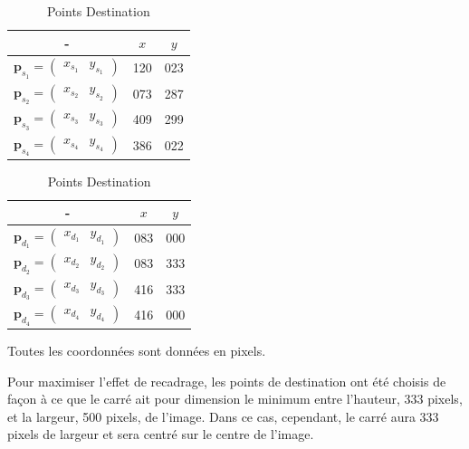 \documentclass[../5RO17_TP1.tex]{subfiles}
\begin{document}
\begin{table}[H]
    \centering
    \caption{Points Homographie}
    \label{tab_homography_points}
    \begin{subtable}[t]{0.475\textwidth}
        \centering
        \begin{tabular}{ccc}
            - & $x$ & $y$\\
            \hline
            $\mathbf{p}_{s_{1}} = \begin{pmatrix} x_{s_{1}} & y_{s_{1}} \end{pmatrix}$ & 120 & 023\\
            $\mathbf{p}_{s_{2}} = \begin{pmatrix} x_{s_{2}} & y_{s_{2}} \end{pmatrix}$ & 073 & 287\\
            $\mathbf{p}_{s_{3}} = \begin{pmatrix} x_{s_{3}} & y_{s_{3}} \end{pmatrix}$ & 409 & 299\\
            $\mathbf{p}_{s_{4}} = \begin{pmatrix} x_{s_{4}} & y_{s_{4}} \end{pmatrix}$ & 386 & 022\\
            \hline
        \end{tabular}
        \caption{Points Source}
    \end{subtable}
    \hfill
    \begin{subtable}[t]{0.475\textwidth}
        \centering
        \begin{tabular}{ccc}
            - & $x$ & $y$\\
            \hline
            $\mathbf{p}_{d_{1}} = \begin{pmatrix} x_{d_{1}} & y_{d_{1}} \end{pmatrix}$ & 083 & 000\\
            $\mathbf{p}_{d_{2}} = \begin{pmatrix} x_{d_{2}} & y_{d_{2}} \end{pmatrix}$ & 083 & 333\\
            $\mathbf{p}_{d_{3}} = \begin{pmatrix} x_{d_{3}} & y_{d_{3}} \end{pmatrix}$ & 416 & 333\\
            $\mathbf{p}_{d_{4}} = \begin{pmatrix} x_{d_{4}} & y_{d_{4}} \end{pmatrix}$ & 416 & 000\\
            \hline
        \end{tabular}
        \caption{Points Destination}
    \end{subtable}
\end{table}
\begin{remark}
    Toutes les coordonnées sont données en pixels.
\end{remark}
\noindent Pour maximiser l'effet de recadrage, les points de destination ont été choisis de façon à ce que le carré ait pour dimension le minimum entre l'hauteur, 333 pixels,  et la largeur, 500 pixels, de l'image. Dans ce cas, cependant, le carré aura 333 pixels de largeur et sera centré sur le centre de l'image.\\
\end{document}
